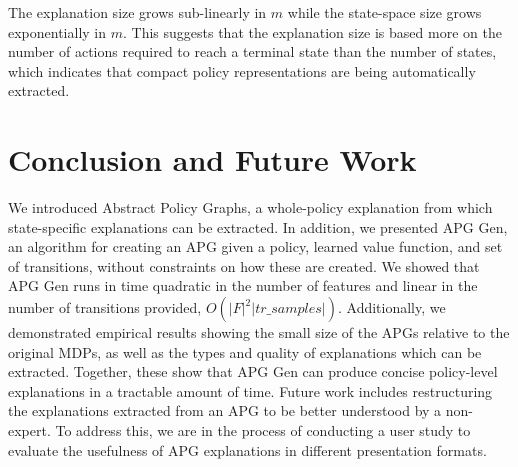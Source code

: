 \documentclass[letterpaper]{article} %
\begin{document}
\vspace{-1.65mm}
\vspace{-3.40mm}
The explanation size grows sub-linearly in $m$ while the state-space size grows exponentially in $m$.
This suggests that the explanation size is based more on the number of actions required to reach a terminal state than the number of states, which indicates that compact policy representations are being automatically extracted.

\vspace{-0.89mm}
\vspace{-1.49mm}
\section{Conclusion and Future Work}
We introduced Abstract Policy Graphs, a whole-policy explanation from which state-specific explanations can be extracted. In addition, we presented APG Gen, an algorithm for creating an APG given a policy, learned value function, and set of transitions, without constraints on how these are created. We showed that APG Gen runs in time quadratic in the number of features and linear in the number of transitions provided, $O(|F|^2 |tr\_samples|)$. Additionally, we demonstrated empirical results showing the small size of the APGs relative to the original MDPs, as well as the types and quality of explanations which can be extracted. Together, these show that APG Gen can produce concise policy-level explanations in a tractable amount of time.
Future work includes restructuring the explanations extracted from an APG to be better understood by a non-expert.
To address this, we are in the process of conducting a user study to evaluate the usefulness of APG explanations in different presentation formats.

\vspace{-0.85mm}
\vspace{-1.66mm}
\end{document}
